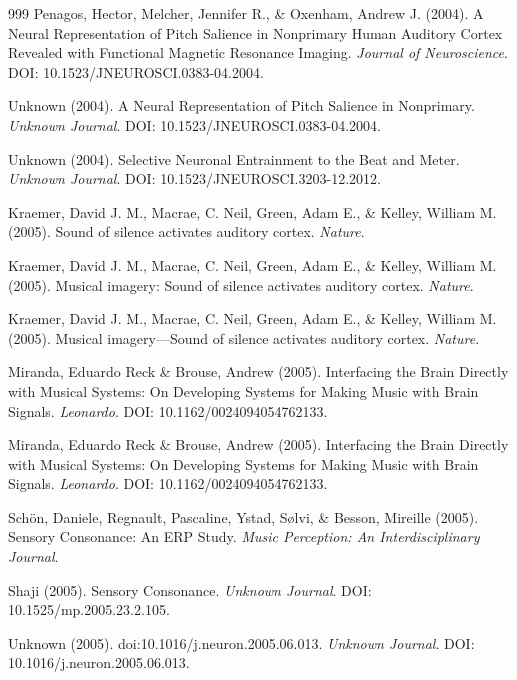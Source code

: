 \documentclass[9pt,onecolumn]{article}
\begin{document}
\begin{thebibliography}{999}
Penagos, Hector, Melcher, Jennifer R., \& Oxenham, Andrew J. (2004). A Neural Representation of Pitch Salience in Nonprimary Human Auditory Cortex Revealed with Functional Magnetic Resonance Imaging. \textit{Journal of Neuroscience}. DOI: 10.1523/JNEUROSCI.0383-04.2004.

Unknown (2004). A Neural Representation of Pitch Salience in Nonprimary. \textit{Unknown Journal}. DOI: 10.1523/JNEUROSCI.0383-04.2004.

Unknown (2004). Selective Neuronal Entrainment to the Beat and Meter. \textit{Unknown Journal}. DOI: 10.1523/JNEUROSCI.3203-12.2012.

Kraemer, David J. M., Macrae, C. Neil, Green, Adam E., \& Kelley, William M. (2005). Sound of silence activates auditory cortex. \textit{Nature}.

Kraemer, David J. M., Macrae, C. Neil, Green, Adam E., \& Kelley, William M. (2005). Musical imagery: Sound of silence activates auditory cortex. \textit{Nature}.

Kraemer, David J. M., Macrae, C. Neil, Green, Adam E., \& Kelley, William M. (2005). Musical imagery—Sound of silence activates auditory cortex. \textit{Nature}.

Miranda, Eduardo Reck \& Brouse, Andrew (2005). Interfacing the Brain Directly with Musical Systems: On Developing Systems for Making Music with Brain Signals. \textit{Leonardo}. DOI: 10.1162/0024094054762133.

Miranda, Eduardo Reck \& Brouse, Andrew (2005). Interfacing the Brain Directly with Musical Systems: On Developing Systems for Making Music with Brain Signals. \textit{Leonardo}. DOI: 10.1162/0024094054762133.

Schön, Daniele, Regnault, Pascaline, Ystad, Sølvi, \& Besson, Mireille (2005). Sensory Consonance: An ERP Study. \textit{Music Perception: An Interdisciplinary Journal}.

Shaji (2005). Sensory Consonance. \textit{Unknown Journal}. DOI: 10.1525/mp.2005.23.2.105.

Unknown (2005). doi:10.1016/j.neuron.2005.06.013. \textit{Unknown Journal}. DOI: 10.1016/j.neuron.2005.06.013.


\end{thebibliography}
\end{document}
